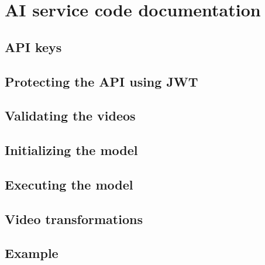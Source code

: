 \section{AI service code documentation}
    \subsection{API keys}
    \subsection{Protecting the API using JWT}
    \subsection{Validating the videos}
    \subsection{Initializing the model}
    \subsection{Executing the model}
        \subsection{Video transformations}
    \subsection{Example}
    